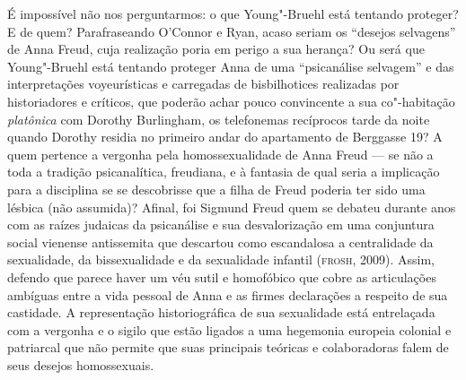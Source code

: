 É impossível não nos perguntarmos: o que Young"-Bruehl está tentando
proteger? E de quem? Parafraseando O'Connor e Ryan, acaso seriam os
``desejos selvagens'' de Anna Freud, cuja realização poria em perigo a sua
herança? Ou será que Young"-Bruehl está tentando proteger Anna de uma
``psicanálise selvagem'' e das interpretações voyeurísticas e carregadas
de bisbilhotices realizadas por historiadores e críticos, que poderão
achar pouco convincente a sua co"-habitação \emph{platônica} com Dorothy
Burlingham, os telefonemas recíprocos tarde da noite quando Dorothy
residia no primeiro andar do apartamento de Berggasse 19? A quem
pertence a vergonha pela homossexualidade de Anna Freud --- se não a toda
a tradição psicanalítica, freudiana, e à fantasia de qual seria a
implicação para a disciplina se se descobrisse que a filha de Freud
poderia ter sido uma lésbica (não assumida)? Afinal, foi Sigmund Freud
quem se debateu durante anos com as raízes judaicas da psicanálise e sua
desvalorização em uma conjuntura social vienense antissemita que
descartou como escandalosa a centralidade da sexualidade, da
bissexualidade e da sexualidade infantil (\textsc{frosh}, 2009). Assim, defendo
que parece haver um véu sutil e homofóbico que cobre as articulações
ambíguas entre a vida pessoal de Anna e as firmes declarações a respeito
de sua castidade. A representação historiográfica de sua sexualidade
está entrelaçada com a vergonha e o sigilo que estão ligados a uma
hegemonia europeia colonial e patriarcal que não permite que suas
principais teóricas e colaboradoras falem de seus desejos homossexuais.

